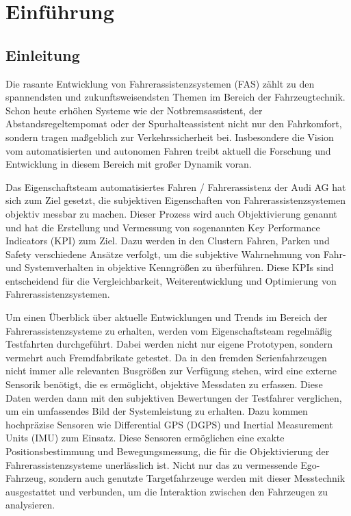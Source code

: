 \chapter{Einführung}
\label{einfuehrung}

\section{Einleitung}
Die rasante Entwicklung von Fahrerassistenzsystemen (FAS) zählt zu den spannendsten und zukunftsweisendsten Themen im Bereich der Fahrzeugtechnik. Schon heute erhöhen Systeme wie der Notbremsassistent, der Abstandsregeltempomat oder der Spurhalteassistent nicht nur den Fahrkomfort, sondern tragen ma{\ss}geblich zur Verkehrssicherheit bei. Insbesondere die Vision vom automatisierten und autonomen Fahren treibt aktuell die Forschung und Entwicklung in diesem Bereich mit gro{\ss}er Dynamik voran.

Das Eigenschaftsteam automatisiertes Fahren / Fahrerassistenz der Audi AG hat sich zum Ziel gesetzt, die subjektiven Eigenschaften von Fahrerassistenzsystemen objektiv messbar zu machen. Dieser Prozess wird auch Objektivierung genannt und hat die Erstellung und Vermessung von sogenannten Key Performance Indicators (KPI) zum Ziel. Dazu werden in den Clustern Fahren, Parken und Safety verschiedene Ansätze verfolgt, um die subjektive Wahrnehmung von Fahr- und Systemverhalten in objektive Kenngrö{\ss}en zu überführen. Diese KPIs sind entscheidend für die Vergleichbarkeit, Weiterentwicklung und Optimierung von Fahrerassistenzsystemen.

Um einen Überblick über aktuelle Entwicklungen und Trends im Bereich der Fahrerassistenzsysteme zu erhalten, werden vom Eigenschaftsteam regelmä{\ss}ig Testfahrten durchgeführt. Dabei werden nicht nur eigene Prototypen, sondern vermehrt auch Fremdfabrikate getestet. Da in den fremden Serienfahrzeugen nicht immer alle relevanten Busgrö{\ss}en zur Verfügung stehen, wird eine externe Sensorik benötigt, die es ermöglicht, objektive Messdaten zu erfassen. Diese Daten werden dann mit den subjektiven Bewertungen der Testfahrer verglichen, um ein umfassendes Bild der Systemleistung zu erhalten.
Dazu kommen hochpräzise Sensoren wie Differential GPS (DGPS) und Inertial Measurement Units (IMU) zum Einsatz. Diese Sensoren ermöglichen eine exakte Positionsbestimmung und Bewegungsmessung, die für die Objektivierung der Fahrerassistenzsysteme unerlässlich ist. Nicht nur das zu vermessende Ego-Fahrzeug, sondern auch genutzte Targetfahrzeuge werden mit dieser Messtechnik ausgestattet und verbunden, um die Interaktion zwischen den Fahrzeugen zu analysieren.

